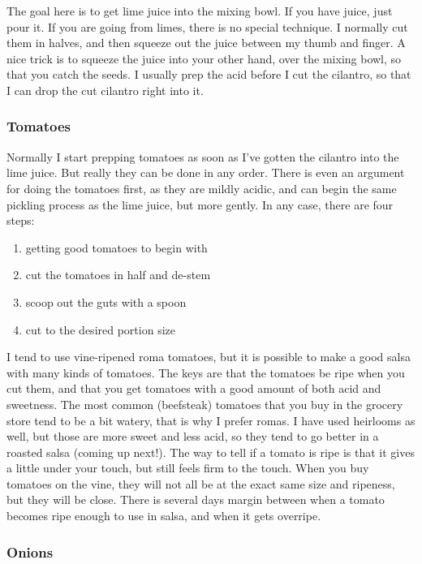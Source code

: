 The goal here is to get lime juice into the mixing bowl. If you have juice, just pour it. If you are going from limes, there is no special technique. I normally cut them in halves, and then squeeze out the juice between my thumb and finger. A nice trick is to squeeze the juice into your other hand, over the mixing bowl, so that you catch the seeds. I usually prep the acid before I cut the cilantro, so that I can drop the cut cilantro right into it. 

\subsubsection{Tomatoes}

Normally I start prepping tomatoes as soon as I've gotten the cilantro into the lime juice. But really they can be done in any order. There is even an argument for doing the tomatoes first, as they are mildly acidic, and can begin the same pickling process as the lime juice, but more gently. In any case, there are four steps: \begin{enumerate}
    \item getting good tomatoes to begin with
    \item cut the tomatoes in half and de-stem
    \item scoop out the guts with a spoon
    \item cut to the desired portion size
\end{enumerate}

I tend to use vine-ripened roma tomatoes, but it is possible to make a good salsa with many kinds of tomatoes. The keys are that the tomatoes be ripe when you cut them, and that you get tomatoes with a good amount of both acid and sweetness. The most common (beefsteak) tomatoes that you buy in the grocery store tend to be a bit watery, that is why I prefer romas. I have used heirlooms as well, but those are more sweet and less acid, so they tend to go better in a roasted salsa (coming up next!). The way to tell if a tomato is ripe is that it gives a little under your touch, but still feels firm to the touch. When you buy tomatoes on the vine, they will not all be at the exact same size and ripeness, but they will be close. There is several days margin between when a tomato becomes ripe enough to use in salsa, and when it gets overripe. 

\subsubsection{Onions}

